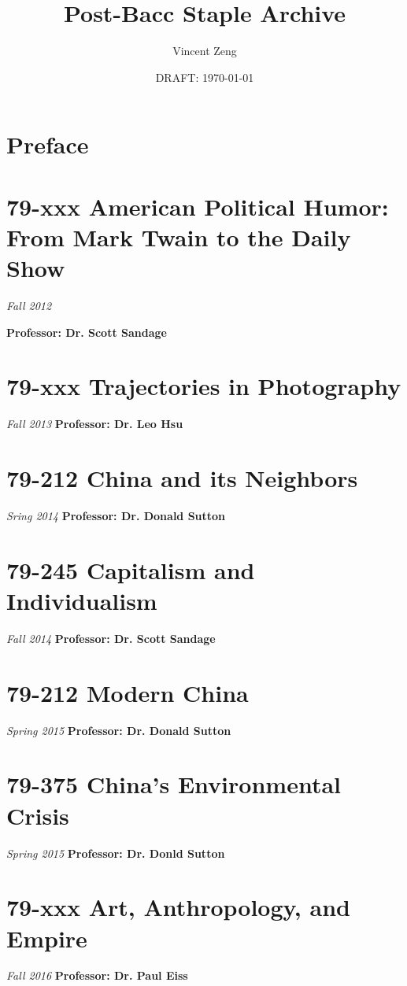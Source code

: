 \documentclass{book}[10pt,letterpaper,openany]
\begin{document}
\title{Post-Bacc Staple Archive}
\author{Vincent Zeng}
\date{DRAFT: \today}

\frontmatter

\maketitle
\tableofcontents

\chapter{Preface}


\mainmatter
\chapter{79-xxx American Political Humor: From Mark Twain to the
Daily Show}

\textit{Fall 2012}

\textbf{Professor: Dr. Scott Sandage}

\chapter{79-xxx Trajectories in Photography}
\textit{Fall 2013}
\textbf{Professor: Dr. Leo Hsu}

\chapter{79-212 China and its Neighbors}
\textit{Sring 2014}
\textbf{Professor: Dr. Donald Sutton}

\chapter{79-245 Capitalism and Individualism}
\textit{Fall 2014}
\textbf{Professor: Dr. Scott Sandage}

\chapter{79-212 Modern China}
\textit{Spring 2015}
\textbf{Professor: Dr. Donald Sutton}

\chapter{79-375 China's Environmental Crisis}
\textit{Spring 2015}
\textbf{Professor: Dr. Donld Sutton}

\chapter{79-xxx Art, Anthropology, and Empire}
\textit{Fall 2016}
\textbf{Professor: Dr. Paul Eiss}
\end{document}
